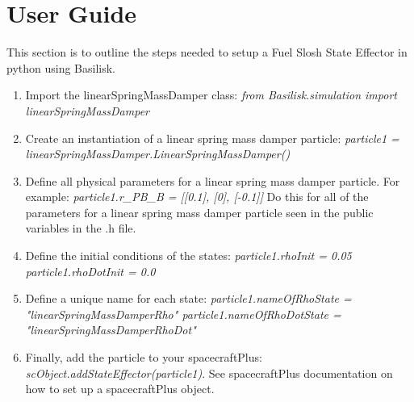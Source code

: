 \section{User Guide}

This section is to outline the steps needed to setup a Fuel Slosh State Effector in python using Basilisk.

\begin{enumerate}
	\item Import the linearSpringMassDamper class: \newline \textit{from Basilisk.simulation import linearSpringMassDamper}
	\item Create an instantiation of a linear spring mass damper particle: \newline \textit{particle1 = linearSpringMassDamper.LinearSpringMassDamper()}
	\item Define all physical parameters for a linear spring mass damper particle. For example: \newline
	\textit{particle1.r\_PB\_B = [[0.1], [0], [-0.1]]}
	Do this for all of the parameters for a linear spring mass damper particle seen in the public variables in the .h file.
	\item Define the initial conditions of the states:\newline
	\textit{particle1.rhoInit = 0.05 \quad particle1.rhoDotInit = 0.0}
	\item Define a unique name for each state:\newline
	\textit{particle1.nameOfRhoState = "linearSpringMassDamperRho" \quad particle1.nameOfRhoDotState = "linearSpringMassDamperRhoDot"}
	\item Finally, add the particle to your spacecraftPlus:\newline
	\textit{scObject.addStateEffector(particle1)}. See spacecraftPlus documentation on how to set up a spacecraftPlus object. 
\end{enumerate}
